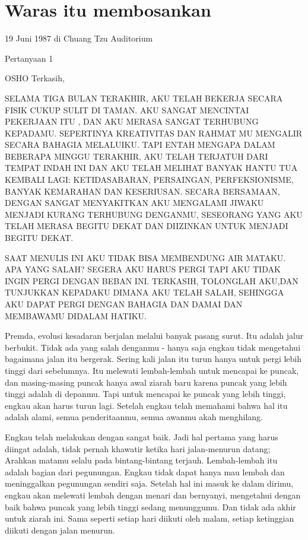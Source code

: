 \chapter{Waras itu membosankan}
19 Juni 1987 di Chuang Tzu Auditorium

Pertanyaan 1

OSHO Terkasih,

SELAMA TIGA BULAN TERAKHIR, AKU TELAH BEKERJA SECARA FISIK CUKUP SULIT DI TAMAN.
AKU SANGAT MENCINTAI PEKERJAAN ITU , DAN AKU MERASA SANGAT TERHUBUNG KEPADAMU.
SEPERTINYA KREATIVITAS DAN RAHMAT MU MENGALIR SECARA BAHAGIA MELALUIKU.
TAPI ENTAH MENGAPA DALAM BEBERAPA MINGGU TERAKHIR,
AKU TELAH TERJATUH DARI TEMPAT INDAH INI DAN AKU TELAH MELIHAT BANYAK HANTU TUA KEMBALI LAGI:
KETIDASABARAN, PERSAINGAN, PERFEKSIONISME, BANYAK KEMARAHAN DAN KESERIUSAN.
SECARA BERSAMAAN, DENGAN SANGAT MENYAKITKAN AKU MENGALAMI JIWAKU MENJADI KURANG TERHUBUNG DENGANMU,
SESEORANG YANG AKU TELAH MERASA BEGITU DEKAT DAN DIIZINKAN UNTUK MENJADI BEGITU DEKAT.

SAAT MENULIS INI AKU TIDAK BISA MEMBENDUNG AIR MATAKU.
APA YANG SALAH? SEGERA AKU HARUS PERGI TAPI AKU TIDAK INGIN PERGI DENGAN BEBAN INI.
TERKASIH, TOLONGLAH AKU,DAN TUNJUKKAN KEPADAKU DIMANA AKU TELAH SALAH,
SEHINGGA AKU DAPAT PERGI DENGAN BAHAGIA DAN DAMAI DAN MEMBAWAMU DIDALAM HATIKU.

Premda, evolusi kesadaran berjalan melalui banyak pasang surut. Itu adalah jalur berbukit. Tidak ada yang salah denganmu - hanya saja engkau tidak mengetahui bagaimana jalan itu bergerak. Sering kali jalan itu turun hanya untuk pergi lebih tinggi dari sebelumnya. Itu melewati lembah-lembah untuk mencapai ke puncak, dan masing-masing puncak hanya awal ziarah baru karena puncak yang lebih tinggi adalah di depanmu. Tapi untuk mencapai ke puncak yang lebih tinggi, engkau akan harus turun lagi. Setelah engkau telah memahami bahwa hal itu adalah alami, semua penderitaanmu, semua awanmu akah menghilang.

Engkau telah melakukan dengan sangat baik. Jadi hal pertama yang harus diingat adalah, tidak pernah khawatir ketika hari jalan-menurun datang; Arahkan matamu selalu pada bintang-bintang terjauh. Lembah-lembah itu adalah bagian dari pegunungan. Engkau tidak dapat hanya mau lembah dan meninggalkan pegunungan sendiri saja. Setelah hal ini masuk ke dalam dirimu, engkau akan melewati lembah dengan menari dan bernyanyi, mengetahui dengan baik bahwa puncak yang lebih tinggi sedang menunggumu. Dan tidak ada akhir untuk ziarah ini. Sama seperti setiap hari diikuti oleh malam, setiap ketinggian diikuti dengan jalan menurun.

